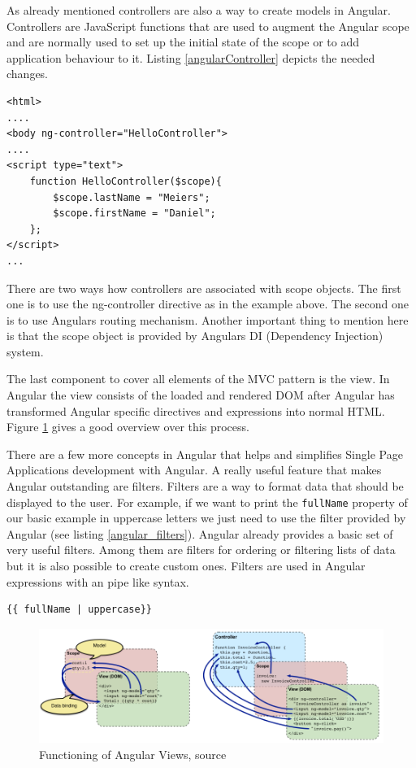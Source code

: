 As already mentioned controllers are also a way to create models in Angular.
Controllers are JavaScript functions that are used to augment the Angular scope and are normally used to set up the initial state of the scope or to add application behaviour to it.
Listing \ref{angularController} depicts the needed changes.

\begin{lstlisting}[label=angularController,caption=Angular Controller]
<html>
....
<body ng-controller="HelloController">
....
<script type="text">
	function HelloController($scope){
	    $scope.lastName = "Meiers";
	    $scope.firstName = "Daniel";
	};
</script>
...
\end{lstlisting}

There are two ways how controllers are associated with scope objects.
The first one is to use the ng-controller directive as in the example above.
The second one is to use Angulars routing mechanism.
Another important thing to mention here is that the scope object is provided by Angulars DI (Dependency Injection) system.
 
The last component to cover all elements of the MVC pattern is the view.
In Angular the view consists of the loaded and rendered DOM after Angular has transformed Angular specific directives and expressions into normal HTML.
Figure \ref{fig:angular_views} gives a good overview over this process.
 
There are a few more concepts in Angular that helps and simplifies Single Page Applications development with Angular.
A really useful feature that makes Angular outstanding are filters.
Filters are a way to format data that should be displayed to the user.
For example, if we want to print the \texttt{fullName} property of our basic example in uppercase letters we just need to use the  filter provided by Angular (see listing \ref{angular_filters}).
Angular already provides a basic set of very useful filters. 
Among them are filters for ordering or filtering lists of data but it is also possible to create custom ones.
Filters are used in Angular expressions with an pipe like syntax.

\begin{lstlisting}[label=angular_filters,caption=Angular Filters]
 {{ fullName | uppercase}}
\end{lstlisting}

\begin{figure}
	\centering	
	\includegraphics[width=1.0\textwidth]{./img/tech-ana/angular_view.png}
	\caption{Functioning of Angular Views, source \autocite{tech-ana:ng-concepts}}
	\label{fig:angular_views}
\end{figure} 

